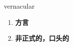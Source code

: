
\begin{frame}
{\huge vernacular}
\begin{center}
\begin{enumerate}\Large
  \item \textbf{方言}
  \item \textbf{非正式的，口头的}
\end{enumerate}
\end{center}
\end{frame}
